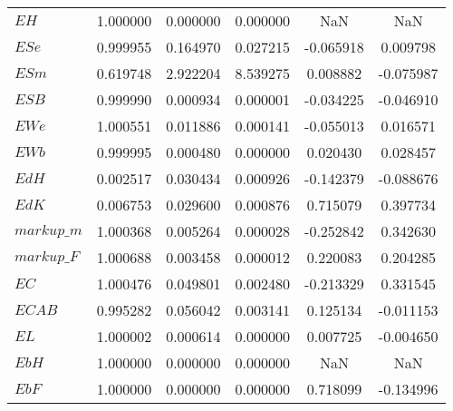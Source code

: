 \begin{center}
\begin{longtable}{lccccc}
$EH                         $	 & 	        1.000000	 & 	        0.000000	 & 	        0.000000	 & 	             NaN	 & 	             NaN \\ 
$ESe                        $	 & 	        0.999955	 & 	        0.164970	 & 	        0.027215	 & 	       -0.065918	 & 	        0.009798 \\ 
$ESm                        $	 & 	        0.619748	 & 	        2.922204	 & 	        8.539275	 & 	        0.008882	 & 	       -0.075987 \\ 
$ESB                        $	 & 	        0.999990	 & 	        0.000934	 & 	        0.000001	 & 	       -0.034225	 & 	       -0.046910 \\ 
$EWe                        $	 & 	        1.000551	 & 	        0.011886	 & 	        0.000141	 & 	       -0.055013	 & 	        0.016571 \\ 
$EWb                        $	 & 	        0.999995	 & 	        0.000480	 & 	        0.000000	 & 	        0.020430	 & 	        0.028457 \\ 
$EdH                        $	 & 	        0.002517	 & 	        0.030434	 & 	        0.000926	 & 	       -0.142379	 & 	       -0.088676 \\ 
$EdK                        $	 & 	        0.006753	 & 	        0.029600	 & 	        0.000876	 & 	        0.715079	 & 	        0.397734 \\ 
$markup\_m                  $	 & 	        1.000368	 & 	        0.005264	 & 	        0.000028	 & 	       -0.252842	 & 	        0.342630 \\ 
$markup\_F                  $	 & 	        1.000688	 & 	        0.003458	 & 	        0.000012	 & 	        0.220083	 & 	        0.204285 \\ 
$EC                         $	 & 	        1.000476	 & 	        0.049801	 & 	        0.002480	 & 	       -0.213329	 & 	        0.331545 \\ 
$ECAB                       $	 & 	        0.995282	 & 	        0.056042	 & 	        0.003141	 & 	        0.125134	 & 	       -0.011153 \\ 
$EL                         $	 & 	        1.000002	 & 	        0.000614	 & 	        0.000000	 & 	        0.007725	 & 	       -0.004650 \\ 
$EbH                        $	 & 	        1.000000	 & 	        0.000000	 & 	        0.000000	 & 	             NaN	 & 	             NaN \\ 
$EbF                        $	 & 	        1.000000	 & 	        0.000000	 & 	        0.000000	 & 	        0.718099	 & 	       -0.134996 \\ 

\end{longtable}
\end{center}
